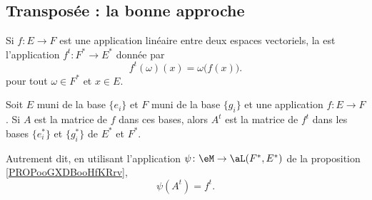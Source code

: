 \subsection{Transposée : la bonne approche}

\begin{definition}      \label{DefooZLPAooKTITdd}
	Si \( f\colon E\to F\) est une application linéaire entre deux espaces vectoriels, la  est l'application \( f^t\colon F^*\to E^*\) donnée par
	\begin{equation}
		f^t(\omega)(x)=\omega\big( f(x) \big).
	\end{equation}
	pour tout \( \omega\in F^*\) et \( x\in E\).
\end{definition}

\begin{lemma}       \label{LEMooEMNNooPquZMg}
	Soit \( E\) muni de la base \( \{ e_i \}\) et \( F\) muni de la base \( \{ g_i \}\) et une application \( f\colon E\to F\). Si \( A\) est la matrice de \( f\) dans ces bases, alors \( A^t\) est la matrice de \( f^t\) dans les bases \( \{ e^*_i \}\) et \( \{ g^*_i \}\) de \( E^*\) et \( F^*\).

	Autrement dit, en utilisant l'application \( \psi\colon \eM\to \aL(F^*,E^*)\) de la proposition \ref{PROPooGXDBooHfKRrv},
	\begin{equation}
		\psi(A^t)=f^t.
	\end{equation}
\end{lemma}

